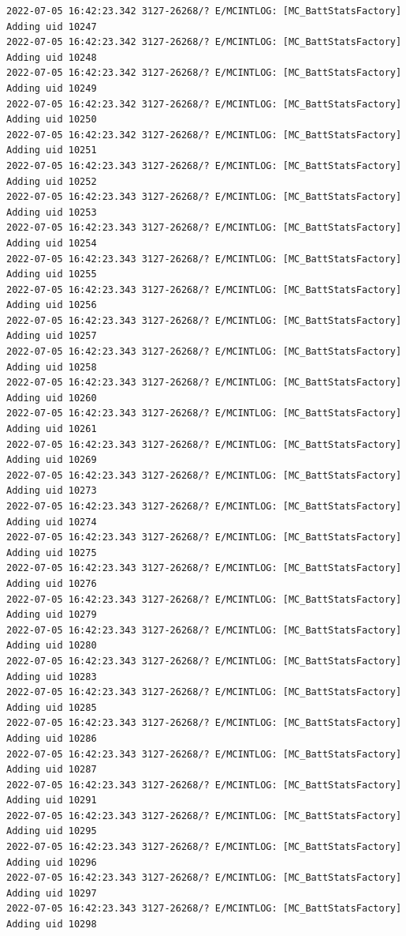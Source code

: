 \documentclass[a4paper,12pt]{book}
\begin{document}
\begin{lstlisting}
2022-07-05 16:42:23.342 3127-26268/? E/MCINTLOG: [MC_BattStatsFactory] Adding uid 10247
2022-07-05 16:42:23.342 3127-26268/? E/MCINTLOG: [MC_BattStatsFactory] Adding uid 10248
2022-07-05 16:42:23.342 3127-26268/? E/MCINTLOG: [MC_BattStatsFactory] Adding uid 10249
2022-07-05 16:42:23.342 3127-26268/? E/MCINTLOG: [MC_BattStatsFactory] Adding uid 10250
2022-07-05 16:42:23.342 3127-26268/? E/MCINTLOG: [MC_BattStatsFactory] Adding uid 10251
2022-07-05 16:42:23.343 3127-26268/? E/MCINTLOG: [MC_BattStatsFactory] Adding uid 10252
2022-07-05 16:42:23.343 3127-26268/? E/MCINTLOG: [MC_BattStatsFactory] Adding uid 10253
2022-07-05 16:42:23.343 3127-26268/? E/MCINTLOG: [MC_BattStatsFactory] Adding uid 10254
2022-07-05 16:42:23.343 3127-26268/? E/MCINTLOG: [MC_BattStatsFactory] Adding uid 10255
2022-07-05 16:42:23.343 3127-26268/? E/MCINTLOG: [MC_BattStatsFactory] Adding uid 10256
2022-07-05 16:42:23.343 3127-26268/? E/MCINTLOG: [MC_BattStatsFactory] Adding uid 10257
2022-07-05 16:42:23.343 3127-26268/? E/MCINTLOG: [MC_BattStatsFactory] Adding uid 10258
2022-07-05 16:42:23.343 3127-26268/? E/MCINTLOG: [MC_BattStatsFactory] Adding uid 10260
2022-07-05 16:42:23.343 3127-26268/? E/MCINTLOG: [MC_BattStatsFactory] Adding uid 10261
2022-07-05 16:42:23.343 3127-26268/? E/MCINTLOG: [MC_BattStatsFactory] Adding uid 10269
2022-07-05 16:42:23.343 3127-26268/? E/MCINTLOG: [MC_BattStatsFactory] Adding uid 10273
2022-07-05 16:42:23.343 3127-26268/? E/MCINTLOG: [MC_BattStatsFactory] Adding uid 10274
2022-07-05 16:42:23.343 3127-26268/? E/MCINTLOG: [MC_BattStatsFactory] Adding uid 10275
2022-07-05 16:42:23.343 3127-26268/? E/MCINTLOG: [MC_BattStatsFactory] Adding uid 10276
2022-07-05 16:42:23.343 3127-26268/? E/MCINTLOG: [MC_BattStatsFactory] Adding uid 10279
2022-07-05 16:42:23.343 3127-26268/? E/MCINTLOG: [MC_BattStatsFactory] Adding uid 10280
2022-07-05 16:42:23.343 3127-26268/? E/MCINTLOG: [MC_BattStatsFactory] Adding uid 10283
2022-07-05 16:42:23.343 3127-26268/? E/MCINTLOG: [MC_BattStatsFactory] Adding uid 10285
2022-07-05 16:42:23.343 3127-26268/? E/MCINTLOG: [MC_BattStatsFactory] Adding uid 10286
2022-07-05 16:42:23.343 3127-26268/? E/MCINTLOG: [MC_BattStatsFactory] Adding uid 10287
2022-07-05 16:42:23.343 3127-26268/? E/MCINTLOG: [MC_BattStatsFactory] Adding uid 10291
2022-07-05 16:42:23.343 3127-26268/? E/MCINTLOG: [MC_BattStatsFactory] Adding uid 10295
2022-07-05 16:42:23.343 3127-26268/? E/MCINTLOG: [MC_BattStatsFactory] Adding uid 10296
2022-07-05 16:42:23.343 3127-26268/? E/MCINTLOG: [MC_BattStatsFactory] Adding uid 10297
2022-07-05 16:42:23.343 3127-26268/? E/MCINTLOG: [MC_BattStatsFactory] Adding uid 10298

\end{lstlisting}
\end{document}
